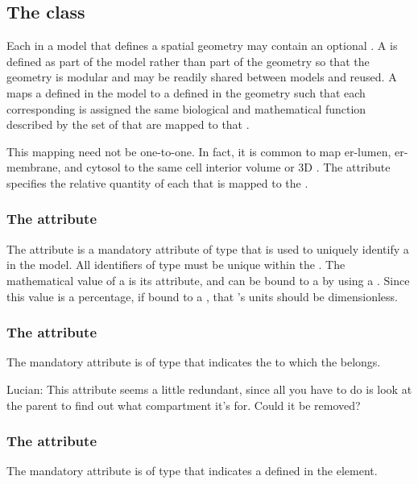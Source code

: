\subsection{The  class}
\label{CompartmentMapping-class}
Each \Compartment in a model that defines a spatial geometry may contain an optional \CompartmentMapping. A \CompartmentMapping is defined as part of the model rather than part of the geometry so that the geometry is modular and may be readily shared between models and reused.  A \CompartmentMapping maps a \Compartment defined in the model to a \DomainType defined in the geometry such that each corresponding \DomainType is assigned the same biological and mathematical function described by the set of \Compartments that are mapped to that \DomainType. 

This mapping need not be one-to-one.  In fact, it is common to map er-lumen, er-membrane, and cytosol to the same cell interior volume or 3D \DomainType.  The  attribute specifies the relative quantity of each \Compartment that is mapped to the \DomainType.

\subsubsection{The  attribute}
The  attribute is a mandatory attribute of type  that is used to uniquely identify a \CompartmentMapping in the model.  All identifiers of type  must be unique within the \Geometry.  The mathematical value of a \CompartmentMapping is its  attribute, and can be bound to a \Parameter by using a \SpatialSymbolReference.  Since this value is a percentage, if bound to a \Parameter, that \Parameter's units should be dimensionless.

\subsubsection{The  attribute}
The mandatory  attribute is of type  that indicates the \Compartment to which the \CompartmentMapping belongs.

{\color{red} Lucian: \notice This attribute seems a little redundant, since all you have to do is look at the parent to find out what compartment it's for.  Could it be removed?}

\subsubsection{The  attribute}
The mandatory  attribute is of type  that indicates a \DomainType defined in the \Geometry element.

